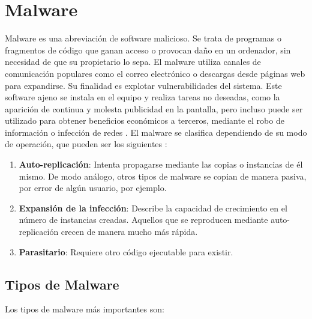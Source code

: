 \section{Malware}\label{sec:2-1}
\noindent Malware es una abreviación de software malicioso. Se trata de programas o fragmentos de código que ganan acceso o provocan daño en un ordenador, sin necesidad de que su propietario lo sepa. El malware utiliza canales de comunicación populares como el correo electrónico o descargas desde páginas web para expandirse. Su finalidad es explotar vulnerabilidades del sistema. Este software ajeno se instala en el equipo y realiza tareas no deseadas, como la aparición de continua y molesta publicidad en la pantalla, pero incluso puede ser utilizado para obtener beneficios económicos a terceros, mediante el robo de información o infección de redes \cite{mwdef}. El malware se clasifica dependiendo de su modo de operación, que pueden ser los siguientes \cite{virusbomb}:
\begin{enumerate}
    \item \textbf{Auto-replicación}: Intenta propagarse mediante las copias o instancias de él mismo. De modo análogo, otros tipos de malware se copian de manera pasiva, por error de algún usuario, por ejemplo.
    \item \textbf{Expansión de la infección}: Describe la capacidad de crecimiento en el número de instancias creadas. Aquellos que se reproducen mediante auto-replicación crecen de manera mucho más rápida. 
    \item \textbf{Parasitario}: Requiere otro código ejecutable para existir.
\end{enumerate}

\subsection{Tipos de Malware}
\noindent Los tipos de malware más importantes son:

